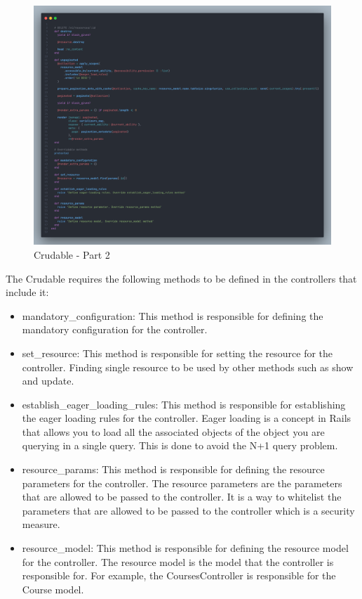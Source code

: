 \begin{justify}
    \begin{figure}[H]
        \centerline{\includegraphics[width=150mm,scale=1]{figures/implementation_and_testing/implementation/backend/curdable-2.png}}
        \caption{Crudable - Part 2}
    \end{figure}

    \vspace{0.25cm}
    \newendline The Crudable requires the following methods to be defined in the controllers that include it:

    \begin{itemize}
        \item mandatory\_configuration: This method is responsible for defining the mandatory configuration for the controller.
        \item set\_resource: This method is responsible for setting the resource for the controller. Finding single resource to be used by other methods such as show and update.
        \item establish\_eager\_loading\_rules: This method is responsible for establishing the eager loading rules for the controller. Eager loading is a concept in Rails that allows you to load all the associated objects of the object you are querying in a single query. This is done to avoid the N+1 query problem.
        \item resource\_params: This method is responsible for defining the resource parameters for the controller. The resource parameters are the parameters that are allowed to be passed to the controller. It is a way to whitelist the parameters that are allowed to be passed to the controller which is a security measure.
        \item resource\_model: This method is responsible for defining the resource model for the controller. The resource model is the model that the controller is responsible for. For example, the CoursesController is responsible for the Course model.
    \end{itemize}


\end{justify}
